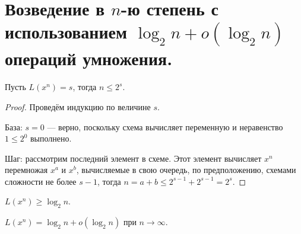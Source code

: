 \section{Возведение в $n$-ю степень с использованием $\log_2 n + o(\log_2 n)$ операций умножения.}

\begin{lemma}
    Пусть $L(x^n) = s$, тогда $n \leqslant 2^s$.
\end{lemma}

\begin{proof}
    Проведём индукцию по величине $s$.
    
    База: $s = 0$ --- верно, поскольку схема вычисляет переменную и неравенство $1\leqslant 2^0$ выполнено.

    Шаг: рассмотрим последний элемент в схеме. Этот элемент вычисляет $x^n$ перемножая $x^a$ и $x^b$, вычисляемые в свою очередь, по предположению, схемами сложности не более $s-1$, тогда $n=a+b\leqslant 2^{s-1} + 2^{s-1} = 2^s$. 
\end{proof}

\begin{corollary}
    $L(x^n) \geqslant \log_2 n$.
\end{corollary}

\begin{theorem}
    $L(x^n) = \log_2 n + o(\log_2 n)$ при $n\to \infty$. 
\end{theorem}

